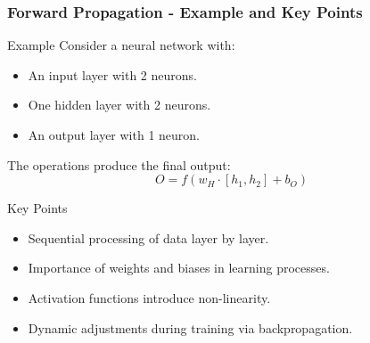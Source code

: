 \documentclass[aspectratio=169]{beamer}
\begin{document}
\begin{frame}[fragile]
    \frametitle{Forward Propagation - Example and Key Points}
    \begin{block}{Example}
        Consider a neural network with:
        \begin{itemize}
            \item An input layer with 2 neurons.
            \item One hidden layer with 2 neurons.
            \item An output layer with 1 neuron.
        \end{itemize}
        The operations produce the final output:
        \begin{equation}
            O = f(w_H \cdot [h_1, h_2] + b_O)
        \end{equation}
    \end{block}

    \begin{block}{Key Points}
        \begin{itemize}
            \item Sequential processing of data layer by layer.
            \item Importance of weights and biases in learning processes.
            \item Activation functions introduce non-linearity.
            \item Dynamic adjustments during training via backpropagation.
        \end{itemize}
    \end{block}
\end{frame}
\end{document}
